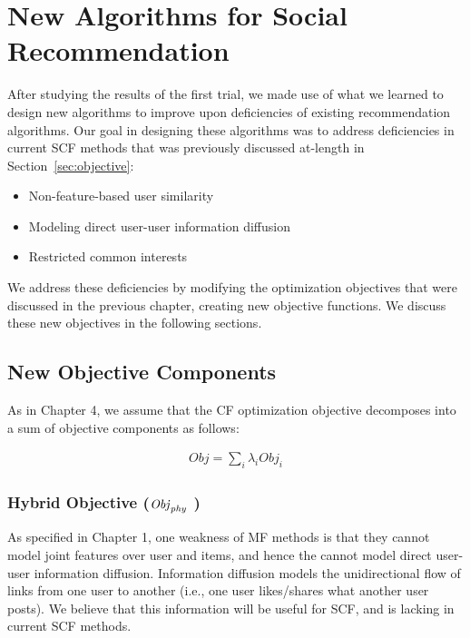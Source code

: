 \chapter{New Algorithms for Social Recommendation}

After studying the results of the first trial, we made use of what we learned to design new algorithms to improve upon deficiencies of existing recommendation algorithms. Our goal in designing these algorithms was to address deficiencies in current SCF methods that was previously discussed at-length in Section~\ref{sec:objective}:

\begin{itemize}
\item {Non-feature-based user similarity}
\item {Modeling direct user-user information diffusion}
\item {Restricted common interests}
\end{itemize}

We address these deficiencies by modifying the optimization objectives that were discussed in the previous chapter, creating new objective functions. We discuss these new objectives in the following sections.

\section{New Objective Components}
As in Chapter 4, we assume that the CF optimization objective decomposes into a sum of objective components as follows:

\begin{align}
\mathit{Obj} = \sum_i \lambda_i \mathit{Obj}_i
\end{align}

\subsection{Hybrid Objective ($\mathit{Obj}_{\mathit{phy}}$ )}

As specified in Chapter 1, one weakness of  MF methods is that they cannot model joint features over user and items, and hence the cannot model direct user-user information diffusion. Information diffusion models the unidirectional flow of links from one user to another (i.e., one user likes/shares what another user posts). We believe that this information will be useful for SCF, and is lacking in current SCF methods.

